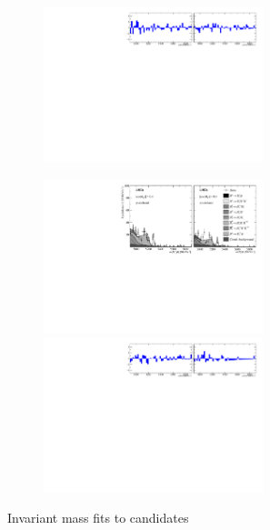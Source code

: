 \begin{figure}[!h]
\begin{subfigure}[t]{1.0\textwidth}
        \includegraphics[width=0.7\textwidth]{figs/Appendix_FitCategories/residuals_DsPhi_merged_both_summed_splitHel_splitKKPi_s21_s21r1_s24_s26.pdf}
    \end{subfigure}
    \begin{subfigure}[t]{1.0\textwidth}
        \centering
        \includegraphics[width=0.7\textwidth]{figs/Appendix_FitCategories/canvas_DsPhiSide_merged_both_summed_splitHel_splitKKPi_s21_s21r1_s24_s26.pdf}\\
        \includegraphics[width=0.7\textwidth]{figs/Appendix_FitCategories/residuals_DsPhiSide_merged_both_summed_splitHel_splitKKPi_s21_s21r1_s24_s26.pdf}
    \end{subfigure}
    \caption{Invariant mass fits to \decay{\Bp}{\Dsp\phiz} candidates}
\end{figure}




